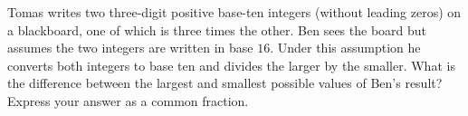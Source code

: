 Tomas writes two three-digit positive base-ten integers (without leading zeros) on a blackboard, one of which is three times the other. Ben sees the board but assumes the two integers are written in base $16$. Under this assumption he converts both integers to base ten and divides the larger by the smaller. What is the difference between the largest and smallest possible values of Ben's result? Express your answer as a common fraction.
